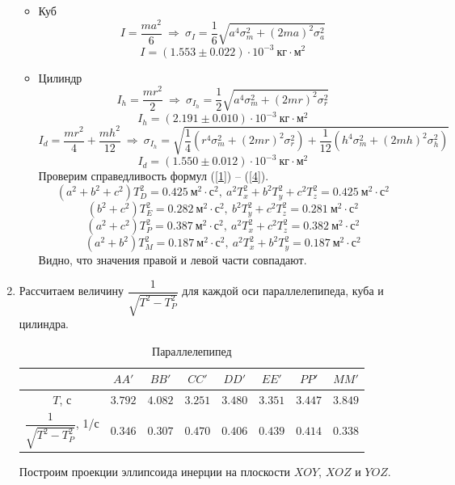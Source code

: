 \documentclass[a4paper,12pt]{article}
\begin{document}
\begin{enumerate}
\begin{itemize}
$$        $$
        \item Куб
        $$
        I = \frac{ma^2}{6}~\Rightarrow~\sigma_I = \frac{1}{6}\sqrt{a^4\sigma^2_m + (2ma)^2\sigma^2_a}
        $$
        $$
        I = (1.553\pm 0.022)\cdot 10^{-3}~\text{кг$\cdot$м$^2$}
        $$
        \item Цилиндр
        $$
        I_h = \frac{mr^2}{2}~\Rightarrow~\sigma_{I_h} = \frac{1}{2}\sqrt{a^4\sigma^2_m + (2mr)^2\sigma^2_r}
        $$
        $$
        I_h = (2.191\pm 0.010)\cdot 10^{-3}~\text{кг$\cdot$м$^2$}
        $$
        $$
        I_d = \frac{mr^2}{4} + \frac{mh^2}{12}~\Rightarrow~\sigma_{I_h} = \sqrt{\frac{1}{4}(r^4\sigma^2_m + (2mr)^2\sigma^2_r) + \frac{1}{12}(h^4\sigma^2_m + (2mh)^2\sigma^2_h)}
        $$
        $$
        I_d = (1.550\pm 0.012)\cdot 10^{-3}~\text{кг$\cdot$м$^2$}
        $$
        Проверим справедливость формул (\ref{1}) -- (\ref{4}).
        $$
        (a^2+b^2+c^2)T^2_{D} = 0.425~\text{м$^2\cdot$с$^2$},~a^2 T^2_{x}+b^2 T^2_{y}+c^2 T^2_{z} = 0.425~\text{м$^2\cdot$с$^2$}
        $$
        $$
        (b^2+c^2)T^2_{E} = 0.282~\text{м$^2\cdot$с$^2$},~b^2 T^2_{y}+c^2 T^2_{z} = 0.281~\text{м$^2\cdot$с$^2$}
        $$
        $$
        (a^2+c^2)T^2_{P} = 0.387~\text{м$^2\cdot$с$^2$},~a^2 T^2_{x}+c^2 T^2_{z} = 0.382~\text{м$^2\cdot$с$^2$}
        $$
        $$
        (a^2+b^2)T^2_{M} = 0.187~\text{м$^2\cdot$с$^2$},~a^2 T^2_{x}+b^2 T^2_{y} = 0.187~\text{м$^2\cdot$с$^2$}
        $$
        Видно, что значения правой и левой части совпадают.
    \end{itemize}
    \item Рассчитаем величину $\dfrac{1}{\sqrt{T^2 - T^2_P}}$ для каждой оси параллелепипеда, куба и цилиндра.
        \begin{table}[!h]
            \centering
            \begin{tabular}{|c|c|c|c|c|c|c|c|} \hline
                 & $AA'$ & $BB'$ & $CC'$ & $DD'$ & $EE'$ & $PP'$ & $MM'$ \\ \hline
                $T$, с & $3.792$ & $4.082$ & $3.251$ & $3.480$ & $3.351$ & $3.447$ & $3.849$ \\ \hline
                $\dfrac{1}{\sqrt{T^2 - T^2_P}}$, 1/с & $0.346$ & $0.307$ & $0.470$ & $0.406$ & $0.439$ & $0.414$ & $0.338$ \\ \hline
            \end{tabular}
            \caption{Параллелепипед}
        \end{table}

    Построим проекции эллипсоида инерции на плоскости $XOY$, $XOZ$ и $YOZ$.


\end{enumerate}
\end{document}
